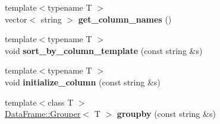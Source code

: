 \begin{DoxyCompactItemize}
\item 
\mbox{\label{classDataFrame_a2371f05dbcaa1a6e503ec0ab4e1e7099}} 
{\footnotesize template$<$typename T $>$ }\\vector$<$ string $>$ {\bfseries get\+\_\+column\+\_\+names} ()
\item 
\mbox{\label{classDataFrame_a413a01311375ca843576552805762b62}} 
{\footnotesize template$<$typename T $>$ }\\void {\bfseries sort\+\_\+by\+\_\+column\+\_\+template} (const string \&s)
\item 
\mbox{\label{classDataFrame_a6ebe3553cef68aeb5c4a2ce85497f20d}} 
{\footnotesize template$<$typename T $>$ }\\void {\bfseries initialize\+\_\+column} (const string \&s)
\item 
\mbox{\label{classDataFrame_ac7d9c37adc8d03f4bd920a113f55c625}} 
{\footnotesize template$<$class T $>$ }\\\hyperlink{classDataFrame_1_1Grouper}{Data\+Frame\+::\+Grouper}$<$ T $>$ {\bfseries groupby} (const string \&s)
\end{DoxyCompactItemize}
